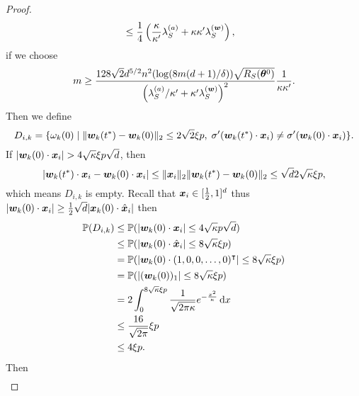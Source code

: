 \documentclass{article}
\begin{document}
\begin{proof}
\begin{equation}
\begin{aligned}
             & \leq \frac{1}{4}\left(\frac{\kappa}{\kappa'}\lambda_S^{(a)}+\kappa\kappa'\lambda_S^{(\bm{w})}\right),
        \end{aligned}
    \end{equation}
    if we choose
    \begin{equation}\label{cond:m1}
        m\geq\frac{128\sqrt{2}d^{5/2}n^2(\log(8m(d+1)/\delta))\sqrt{R_S(\bm{\theta}^0)}}{\left(\lambda_S^{(a)}/\kappa'+\kappa'\lambda_S^{(\bm{w})}\right)^2}\frac{1}{\kappa\kappa'}.
    \end{equation}
    Then we define
    \begin{equation}
        D_{i,k}=\{\omega_k(0)\mid \lVert\bm{w}_k(t^*)-\bm{w}_k(0)\rVert_2\leq 2\sqrt{2}\xi p,\;\sigma'(\bm{w}_k(t^*)\cdot\bm{x}_i)\not=\sigma'(\bm{w}_k(0)\cdot\bm{x}_i)\}.
    \end{equation}
    If $|\vw_k(0)\cdot\vx_i|>4\sqrt{\kappa}\xi p\sqrt{d}$, then
    \begin{equation}
        |\bm{w}_k(t^*)\cdot\bm{x}_i-\bm{w}_k(0)\cdot\bm{x}_i|\leq\lVert\bm{x}_i\rVert_2\lVert\bm{w}_k(t^*)-\bm{w}_k(0)\rVert_2\leq\sqrt{d}2\sqrt{\kappa}\xi p,
    \end{equation}
    which means $D_{i,k}$ is empty. Recall that $\bm{x}_i\in[\frac{1}{2}, 1]^d$ thus $|\bm{w}_k(0)\cdot\bm{x}_i|\geq\frac{1}{2}\sqrt{d}|\bm{x}_k(0)\cdot\hat{\bm{x}}_i|$ then
    \begin{equation}
        \begin{aligned}
            \mathbb{P}(D_{i,k})
             & \leq\mathbb{P}(|\bm{w}_k(0)\cdot\bm{x}_i|\leq 4\sqrt{\kappa}p\sqrt{d})                               \\
             & \leq\mathbb{P}(|\bm{w}_k(0)\cdot\hat{\bm{x}}_i|\leq 8\sqrt{\kappa}\xi p)                             \\
             & = \mathbb{P}(|\bm{w}_k(0)\cdot(1,0,0,\ldots,0)^{\intercal}|\leq 8\sqrt{\kappa}\xi p)                     \\
             & = \mathbb{P}(|(\bm{w}_k(0))_1|\leq 8\sqrt{\kappa}\xi p)                                           \\
             & = 2\int_0^{8\sqrt{\kappa}\xi p}\frac{1}{\sqrt{2\pi\kappa}}e^{-\frac{x^2}{\kappa}}\mathop{}\!\mathrm{d}{x} \\
             & \leq \frac{16}{\sqrt{2\pi}}\xi p                                                          \\
             & \leq 4\xi p.
        \end{aligned}
    \end{equation}
    Then
    \begin{equation}
        \begin{aligned}

\end{aligned}
\end{equation}
\end{proof}
\end{document}
